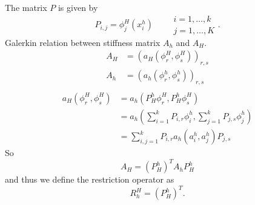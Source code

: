 The matrix $P$ is given by
\[
	P_{i,j} = \phi _{j}^{H}(x_{i}^{h}) \qquad 
	\begin{array}{l}
	i=1, \ldots, k \\
	j=1, \ldots, K
	\end{array}
.\] 
Galerkin relation between stiffness matrix $A_{h}$ and $A_{H}$.
\begin{align*}
	A_{H} &= (a_{H}(\phi _{r}^{H}, \phi _{s}^{H}))_{r,s}\\
	A_{h} &= (a_{h}(\phi _{r}^{h}, \phi _{s}^{h}))_{r,s}\\
\end{align*}
\begin{align*}
	a_{H}(\phi _{r}^{H}, \phi _{s}^{H}) &= a_{h}(P_{H}^{h}\phi _{r}^{H}, P_{H}^{h}\phi _{s}^{H}) \\
										&= a_{h}(\sum_{i=1}^{k}{P_{i,r}\phi _{i}^{h}}, \sum_{j=1}^{k}{P_{j,s}\phi _{j}^{h}}) \\
										&= \sum_{i,j=1}^{k}{P_{i,r}a_{h}(a_{i}^{h}, a_{j}^{h}) P_{j,s}}
\end{align*}
So
\[
	A_{H} = (P_{H}^{h})^{T}A_{h}P_{H}^{h}
\]
and thus we define the restriction operator as
\[
	R_{h}^{H} = (P_{H}^{h})^{T}
.\] 

